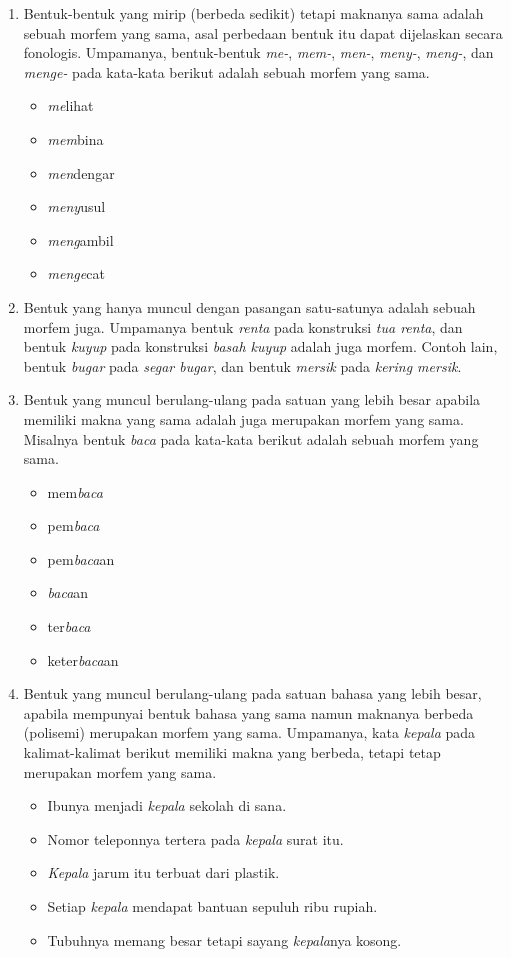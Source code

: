 \begin{enumerate}
	\item Bentuk-bentuk yang mirip (berbeda sedikit) tetapi maknanya sama adalah sebuah morfem yang sama, asal perbedaan bentuk itu dapat dijelaskan secara fonologis. Umpamanya, bentuk-bentuk \textit{me-}, \textit{mem-}, \textit{men-}, \textit{meny-}, \textit{meng-}, dan \textit{menge-} pada kata-kata berikut adalah sebuah morfem yang sama.
	\begin{itemize}
		\item \textit{me}lihat
		\item \textit{mem}bina
		\item \textit{men}dengar
		\item \textit{meny}usul
		\item \textit{meng}ambil
		\item \textit{menge}cat
	\end{itemize}
	
	\item Bentuk yang hanya muncul dengan pasangan satu-satunya adalah sebuah morfem juga. Umpamanya bentuk \textit{renta} pada konstruksi \textit{tua renta}, dan bentuk \textit{kuyup} pada konstruksi \textit{basah kuyup} adalah juga morfem. Contoh lain, bentuk \textit{bugar} pada \textit{segar bugar}, dan bentuk \textit{mersik} pada \textit{kering mersik}.
	
	\item Bentuk yang muncul berulang-ulang pada satuan yang lebih besar apabila memiliki makna yang sama adalah juga merupakan morfem yang sama. Misalnya bentuk \textit{baca} pada kata-kata berikut adalah sebuah morfem yang sama.
	\begin{itemize}
		\item mem\textit{baca}
		\item pem\textit{baca}
		\item pem\textit{baca}an
		\item \textit{baca}an
		\item ter\textit{baca}
		\item keter\textit{baca}an
	\end{itemize}
	
	\item Bentuk yang muncul berulang-ulang pada satuan bahasa yang lebih besar, apabila mempunyai bentuk bahasa yang sama namun maknanya berbeda (polisemi) merupakan morfem yang sama. Umpamanya, kata \textit{kepala} pada kalimat-kalimat berikut memiliki makna yang berbeda, tetapi tetap merupakan morfem yang sama.
	\begin{itemize}
		\item Ibunya menjadi \textit{kepala} sekolah di sana.
		\item Nomor teleponnya tertera pada \textit{kepala} surat itu.
		\item \textit{Kepala} jarum itu terbuat dari plastik.
		\item Setiap \textit{kepala} mendapat bantuan sepuluh ribu rupiah.
		\item Tubuhnya memang besar tetapi sayang \textit{kepala}nya kosong.
	\end{itemize}
\end{enumerate}


